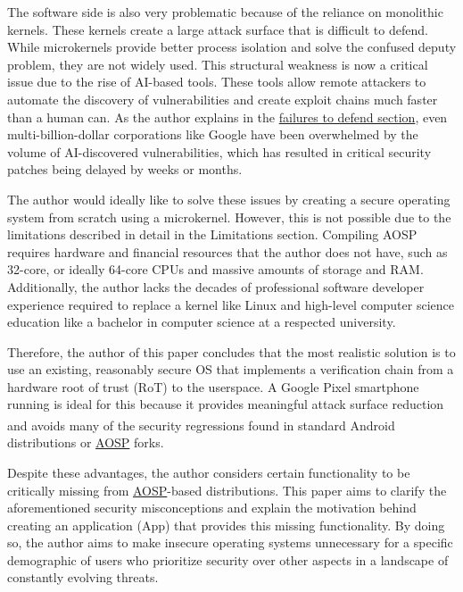 \documentclass[a4paper,12pt]{report}
\begin{document}
The software side is also very problematic because of the reliance on monolithic kernels. These kernels create a large attack surface that is difficult to defend. While microkernels provide better process isolation and solve the confused deputy problem, they are not widely used. This structural weakness is now a critical issue due to the rise of AI-based tools. These tools allow remote attackers to automate the discovery of vulnerabilities and create exploit chains much faster than a human can. As the author explains in the \hyperref[google-failure]{failures to defend section}, even multi-billion-dollar corporations like Google have been overwhelmed by the volume of AI-discovered vulnerabilities, which has resulted in critical security patches being delayed by weeks or months.

The author would ideally like to solve these issues by creating a secure operating system from scratch using a microkernel. However, this is not possible due to the limitations described in detail in the Limitations section. Compiling AOSP requires hardware and financial resources that the author does not have, such as 32-core, or ideally 64-core CPUs and massive amounts of storage and RAM. Additionally, the author lacks the decades of professional software developer experience required to replace a kernel like Linux and high-level computer science education like a bachelor in computer science at a respected university.

Therefore, the author of this paper concludes that the most realistic solution is to use an existing, reasonably secure OS that implements a verification chain from a hardware root of trust (RoT) to the userspace. A Google Pixel smartphone running \citeauthor{grapheneos} is ideal for this because it provides meaningful attack surface reduction and avoids many of the security regressions found in standard Android\texttrademark \textsuperscript{\citep{android-tm}} distributions or \hyperref[aosp]{AOSP} forks.

Despite these advantages, the author considers certain functionality to be critically missing from \hyperref[aosp]{AOSP}-based distributions. This paper aims to clarify the aforementioned security misconceptions and explain the motivation behind creating an application (App) that provides this missing functionality. By doing so, the author aims to make insecure operating systems unnecessary for a specific demographic of users who prioritize security over other aspects in a landscape of constantly evolving threats.
\end{document}
